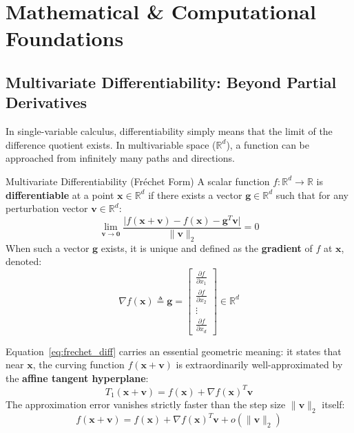 \section{Mathematical \& Computational Foundations}

\subsection{Multivariate Differentiability: Beyond Partial Derivatives}
In single-variable calculus, differentiability simply means that the limit of the difference quotient exists. In multivariable space ($\mathbb{R}^d$), a function can be approached from infinitely many paths and directions.

\begin{definitionbox}{Multivariate Differentiability (Fréchet Form)}
A scalar function $f: \mathbb{R}^d \to \mathbb{R}$ is \textbf{differentiable} at a point $\mathbf{x} \in \mathbb{R}^d$ if there exists a vector $\mathbf{g} \in \mathbb{R}^d$ such that for any perturbation vector $\mathbf{v} \in \mathbb{R}^d$:
\begin{equation}
\lim_{\mathbf{v} \to \mathbf{0}} \frac{\big| f(\mathbf{x} + \mathbf{v}) - f(\mathbf{x}) - \mathbf{g}^T \mathbf{v} \big|}{\|\mathbf{v}\|_2} = 0
\label{eq:frechet_diff}
\end{equation}
When such a vector $\mathbf{g}$ exists, it is unique and defined as the \textbf{gradient} of $f$ at $\mathbf{x}$, denoted:
\begin{equation}
\nabla f(\mathbf{x}) \triangleq \mathbf{g} = \begin{bmatrix} \frac{\partial f}{\partial x_1} \\ \frac{\partial f}{\partial x_2} \\ \vdots \\ \frac{\partial f}{\partial x_d} \end{bmatrix} \in \mathbb{R}^d
\end{equation}
\end{definitionbox}

Equation~\eqref{eq:frechet_diff} carries an essential geometric meaning: it states that near $\mathbf{x}$, the curving function $f(\mathbf{x} + \mathbf{v})$ is extraordinarily well-approximated by the \textbf{affine tangent hyperplane}:
\begin{equation}
T_1(\mathbf{x} + \mathbf{v}) = f(\mathbf{x}) + \nabla f(\mathbf{x})^T \mathbf{v}
\end{equation}
The approximation error vanishes strictly faster than the step size $\|\mathbf{v}\|_2$ itself:
\begin{equation}
f(\mathbf{x} + \mathbf{v}) = f(\mathbf{x}) + \nabla f(\mathbf{x})^T \mathbf{v} + o(\|\mathbf{v}\|_2)
\end{equation}

